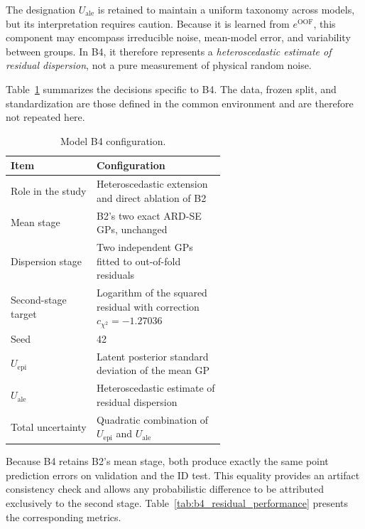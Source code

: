 \documentclass[12pt,a4paper]{report}
\begin{document}
The designation $U_{\mathrm{ale}}$ is retained to maintain a uniform taxonomy across models, but its interpretation requires caution. Because it is learned from $e^{\mathrm{OOF}}$, this component may encompass irreducible noise, mean-model error, and variability between groups. In B4, it therefore represents a \emph{heteroscedastic estimate of residual dispersion}, not a pure measurement of physical random noise.

Table~\ref{tab:b4_configuration} summarizes the decisions specific to B4. The data, frozen split, and standardization are those defined in the common environment and are therefore not repeated here.

\begin{table}[htbp]
    \centering
    \caption{Model B4 configuration.}
    \label{tab:b4_configuration}
    \begin{tabular}{@{}lp{0.60\linewidth}@{}}
        \toprule
        Item & Configuration \\
        \midrule
        Role in the study
            & Heteroscedastic extension and direct ablation of B2 \\
        Mean stage
            & B2's two exact ARD-SE GPs, unchanged \\
        Dispersion stage
            & Two independent GPs fitted to out-of-fold residuals \\
        Second-stage target
            & Logarithm of the squared residual with correction $c_{\chi^2}=-1.27036$ \\
        Seed
            & 42 \\
        $U_{\mathrm{epi}}$
            & Latent posterior standard deviation of the mean GP \\
        $U_{\mathrm{ale}}$
            & Heteroscedastic estimate of residual dispersion \\
        Total uncertainty
            & Quadratic combination of $U_{\mathrm{epi}}$ and $U_{\mathrm{ale}}$ \\
        \bottomrule
    \end{tabular}
\end{table}

Because B4 retains B2's mean stage, both produce exactly the same point prediction errors on validation and the ID test. This equality provides an artifact consistency check and allows any probabilistic difference to be attributed exclusively to the second stage. Table~\ref{tab:b4_residual_performance} presents the corresponding metrics.
\end{document}
